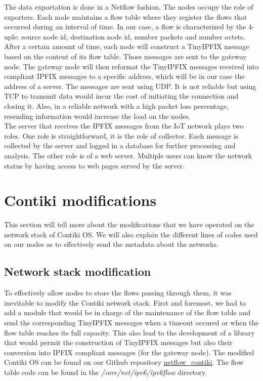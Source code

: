 The data exportation is done in a Netflow fashion. The nodes occupy the role of exporters. Each node maintains a flow table where they register the flows that occurred during an interval of time. In our case, a flow is characterized by the 4-uple: source node id, destination node id, number packets and number octets. After a certain amount of time, each node will construct a TinyIPFIX message based on the content of its flow table. Those messages are sent to the gateway node. The gateway node will then reformat the TinyIPFIX messages received into compliant IPFIX messages to a specific address, which will be in our case the address of a server. The messages are sent using UDP. It is not reliable but using TCP to transmit data would incur the cost of initiating the connection and closing it. Also, in a reliable network with a high packet loss percentage, resending information would increase the load on the nodes.\\

The server that receives the IPFIX messages from the IoT network plays two roles. One role is straightforward, it is the role of collector. Each message is collected by the server and logged in a database for further processing and analysis. The other role is of a web server. Multiple users can know the network status by having access to web pages served by the server.

\section{Contiki modifications}

This section will tell more about the modifications that we have operated on the network stack of Contiki OS. We will also explain the different lines of codes used on our nodes as to effectively send the metadata about the networks.

\subsection{Network stack modification}

To effectively allow nodes to store the flows passing through them, it was inevitable to modify the Contiki network stack. First and foremost, we had to add a module that would be in charge of the maintenance of the flow table and send the corresponding TinyIPFIX messages when a timeout occured or when the flow table reaches its full capacity. This also lead to the development of a library that would permit the construction of TinyIPFIX messages but also their conversion into IPFIX compliant messages (for the gateway node). The modified Contiki OS can be found on our Github repository \href{https://github.com/edd19/netflow_contiki}{netflow\_contiki}. The flow table code can be found in the \textit{/core/net/ipv6/ipv6flow} directory.\\

